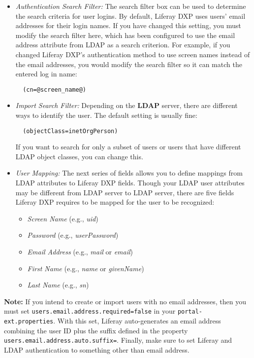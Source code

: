 \begin{itemize}
\item
  \emph{Authentication Search Filter:} The search filter box can be used
  to determine the search criteria for user logins. By default, Liferay
  DXP uses users' email addresses for their login names. If you have
  changed this setting, you must modify the search filter here, which
  has been configured to use the email address attribute from LDAP as a
  search criterion. For example, if you changed Liferay DXP's
  authentication method to use screen names instead of the email
  addresses, you would modify the search filter so it can match the
  entered log in name:

\begin{verbatim}
  (cn=@screen_name@)
\end{verbatim}
\item
  \emph{Import Search Filter:} Depending on the \textbf{LDAP} server,
  there are different ways to identify the user. The default setting is
  usually fine:

\begin{verbatim}
  (objectClass=inetOrgPerson)
\end{verbatim}

  If you want to search for only a subset of users or users that have
  different LDAP object classes, you can change this.
\item
  \emph{User Mapping:} The next series of fields allows you to define
  mappings from LDAP attributes to Liferay DXP fields. Though your LDAP
  user attributes may be different from LDAP server to LDAP server,
  there are five fields Liferay DXP requires to be mapped for the user
  to be recognized:

  \begin{itemize}
  \item
    \emph{Screen Name} (e.g., \emph{uid})
  \item
    \emph{Password} (e.g., \emph{userPassword})
  \item
    \emph{Email Address} (e.g., \emph{mail} or \emph{email})
  \item
    \emph{First Name} (e.g., \emph{name} or \emph{givenName})
  \item
    \emph{Last Name} (e.g., \emph{sn})
  \end{itemize}
\end{itemize}

\textbf{Note:} If you intend to create or import users with no email
addresses, then you must set \texttt{users.email.address.required=false}
in your \texttt{portal-ext.properties}. With this set, Liferay
auto-generates an email address combining the user ID plus the suffix
defined in the property \texttt{users.email.address.auto.suffix=}.
Finally, make sure to set Liferay and LDAP authentication to something
other than email address.

